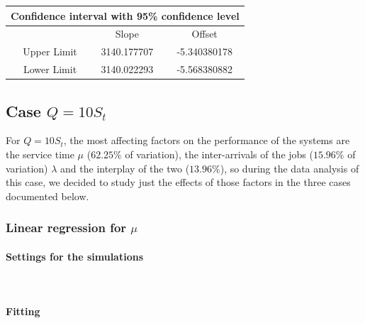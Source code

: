 \documentclass{article}
\begin{document}
                    \begin{table}[htbp]
                        \centering 
                        \begin{tabular}{|c|c|c|}
                            
                            \hline
                            \multicolumn{3}{|c|}{\bf Confidence interval with 95\% confidence level} \\
                            
                            \hline
                            \ & Slope & Offset\\
                            \hline
                            \ Upper Limit & 3140.177707 & -5.340380178 \\ 
                            \hline
                            \ Lower Limit & 3140.022293 & -5.568380882 \\ 
                            \hline
                        \end{tabular}
                        \label{table:CI_5_fitting_lambda}
                    \end{table}
                
 \newpage               
        \subsection{Case $Q = 10S_t$}
            For $Q = 10S_t$, the most affecting factors on the performance of the systems are the service time $\mu$ ($62.25\%$ of variation), the inter-arrivals of the jobs ($15.96\%$ of variation) $\lambda$ and the interplay of the two ($13.96\%$), so during the data analysis of this case, we decided to study just the effects of those factors in the three cases documented below.
            
            \subsubsection{Linear regression for $\mu$}
                \paragraph{Settings for the simulations} \hfill \\
                    
                \paragraph{Fitting} \hfill \\
\end{document}
